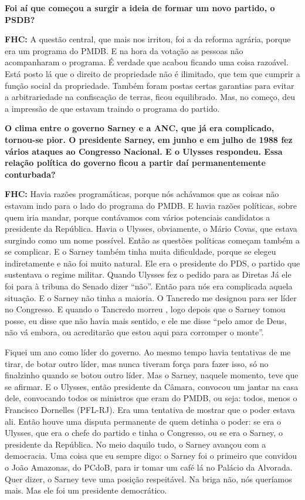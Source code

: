 \textbf{Foi aí que começou a surgir a ideia de formar um novo partido, o
PSDB?}

\textbf{FHC:} A questão central, que mais nos irritou, foi a da reforma
agrária, porque era um programa do PMDB. E na hora da votação as pessoas
não acompanharam o programa. É verdade que acabou ficando uma coisa
razoável. Está posto lá que o direito de propriedade não é ilimitado,
que tem que cumprir a função social da propriedade. Também foram postas
certas garantias para evitar a arbitrariedade na confiscação de terras,
ficou equilibrado. Mas, no começo, deu a impressão de que estavam
traindo o programa do partido.

\textbf{O clima entre o governo Sarney e a ANC, que já era complicado,
tornou-se pior. O presidente Sarney, em junho e em julho de 1988 fez
vários ataques ao Congresso Nacional. E o Ulysses respondeu. Essa
relação política do governo ficou a partir daí permanentemente
conturbada?}

\textbf{FHC:} Havia razões programáticas, porque nós achávamos que as
coisas não estavam indo para o lado do programa do PMDB. E havia razões
políticas, sobre quem iria mandar, porque contávamos com vários
potenciais candidatos a presidente da República. Havia o Ulysses,
obviamente, o Mário Covas, que estava surgindo como um nome possível.
Então as questões políticas começam também a se complicar. E o Sarney
também tinha muita dificuldade, porque se elegeu indiretamente e não foi
muito natural. Ele era o presidente do PDS, o partido que sustentava o
regime militar. Quando Ulysses fez o pedido para as Diretas Já ele foi
para à tribuna do Senado dizer ``não''. Então para nós era complicada
aquela situação. E o Sarney não tinha a maioria. O Tancredo me designou
para ser líder no Congresso. E quando o Tancredo morreu , logo depois
que o Sarney tomou posse, eu disse que não havia mais sentido, e ele me
disse ``pelo amor de Deus, não vá embora, ou acreditarão que estou aqui
para corromper o monte''.

Fiquei um ano como líder do governo. Ao mesmo tempo havia tentativas de
me tirar, de botar outro líder, mas nunca tiveram força para fazer isso,
só no finalzinho quando se botou outro líder. Mas o Sarney, naquele
momento, teve que se afirmar. E o Ulysses, então presidente da Câmara,
convocou um jantar na casa dele, convocando todos os ministros que eram
do PMDB, ou seja: todos, menos o Francisco Dornelles (PFL-RJ). Era uma
tentativa de mostrar que o poder estava ali. Então houve uma disputa
permanente de quem detinha o poder: se era o Ulysses, que era o chefe do
partido e tinha o Congresso, ou se era o Sarney, o presidente da
República. No meio daquilo tudo, o Sarney avançou com a democracia. Uma
coisa que eu sempre digo: o Sarney foi o primeiro que convidou o João
Amazonas, do PCdoB, para ir tomar um café lá no Palácio da Alvorada.
Quer dizer, o Sarney teve uma posição respeitável. Na briga não, nós
queríamos mais. Mas ele foi um presidente democrático.

